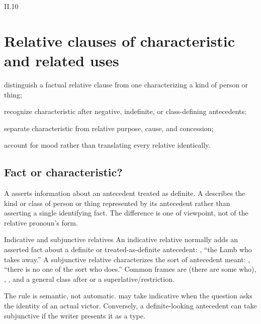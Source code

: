 \begin{courseunit}{II.10}
\chapter{Relative clauses of characteristic and related uses}

\begin{learningobjectives}
  \item distinguish a factual relative clause from one characterizing a kind of person or
        thing;
  \item recognize characteristic after negative, indefinite, or class-defining antecedents;
  \item separate characteristic from relative purpose, cause, and concession;
  \item account for mood rather than translating every relative identically.
\end{learningobjectives}

\section{Fact or characteristic?}

A  asserts information about an antecedent
treated as definite. A  describes the kind or
class of person or thing represented by its antecedent rather than asserting a
single identifying fact. The difference is one of viewpoint, not of the
relative pronoun's form.

\begin{grammarbox}{Indicative and subjunctive relatives}
An indicative relative normally adds an asserted fact about a definite or treated-as-definite
antecedent: , ``the Lamb who takes away.''  A subjunctive relative
characterizes the sort of antecedent meant: , ``there is no one of
the sort who does.''  Common frames are  (there are some who),
, , and a general class after
 or a superlative/restriction.

The rule is semantic, not automatic.   may take indicative when
the question asks the identity of an actual victor.  Conversely, a definite-looking
antecedent can take subjunctive if the writer presents it as a type.
\end{grammarbox}


\end{courseunit}
